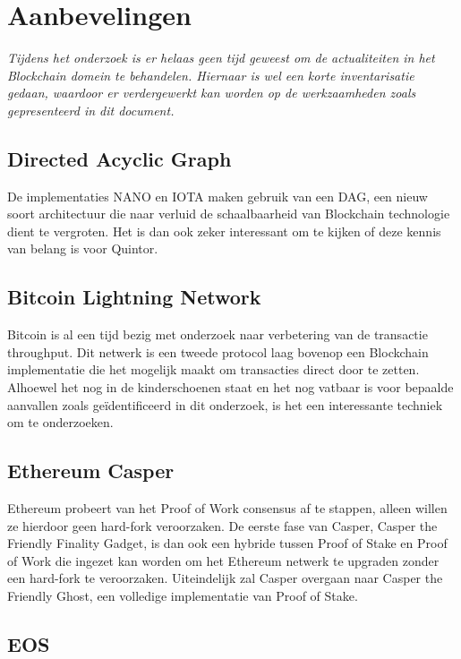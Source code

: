 \chapter{Aanbevelingen}

\textit{Tijdens het onderzoek is er helaas geen tijd geweest om de actualiteiten in het Blockchain domein te behandelen. Hiernaar is wel een korte inventarisatie gedaan, waardoor er verdergewerkt kan worden op de werkzaamheden zoals gepresenteerd in dit document.}

\section{Directed Acyclic Graph}

De implementaties NANO en IOTA maken gebruik van een \acrfull{DAG}, een nieuw soort architectuur die naar verluid de schaalbaarheid van Blockchain technologie dient te vergroten. Het is dan ook zeker interessant om te kijken of deze kennis van belang is voor Quintor.

\section{Bitcoin Lightning Network}

Bitcoin is al een tijd bezig met onderzoek naar verbetering van de transactie throughput. Dit netwerk is een tweede protocol laag bovenop een Blockchain implementatie die het mogelijk maakt om transacties direct door te zetten. Alhoewel het nog in de kinderschoenen staat en het nog vatbaar is voor bepaalde aanvallen zoals geïdentificeerd in dit onderzoek, is het een interessante techniek om te onderzoeken.

\section{Ethereum Casper}

Ethereum probeert van het Proof of Work consensus af te stappen, alleen willen ze hierdoor geen hard-fork veroorzaken. De eerste fase van Casper, Casper the Friendly Finality Gadget, is dan ook een hybride tussen Proof of Stake en Proof of Work die ingezet kan worden om het Ethereum netwerk te upgraden zonder een hard-fork te veroorzaken. Uiteindelijk zal Casper overgaan naar Casper the Friendly Ghost, een volledige implementatie van Proof of Stake.

\newpage
\section{EOS}

